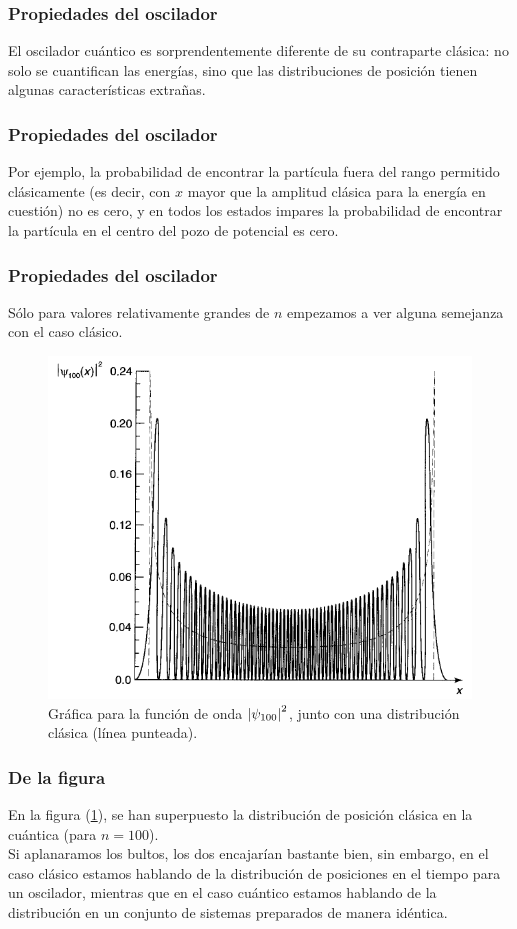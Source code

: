 \documentclass[12pt]{beamer}
\begin{document}
\begin{frame}
\frametitle{Propiedades del oscilador}
El oscilador cuántico es sorprendentemente diferente de su contraparte clásica: \pause 
no solo se cuantifican las energías, sino que las distribuciones de posición tienen algunas características extrañas. 
\end{frame}
\begin{frame}
\frametitle{Propiedades del oscilador}
Por ejemplo, la probabilidad de encontrar la partícula fuera del rango permitido clásicamente (es decir, con $x$ mayor que la amplitud clásica para la energía en cuestión) no es cero, \pause y en todos los estados impares la probabilidad de encontrar la partícula en el centro del pozo de potencial es cero.
\end{frame}
\begin{frame}
\frametitle{Propiedades del oscilador}    
Sólo para valores relativamente grandes de $n$ empezamos a ver alguna semejanza con el caso clásico. 
\end{frame}
\begin{frame}[plain]
\begin{figure}[H]
    \centering
    \includegraphics[scale=0.35]{Imagenes/Funcion_Onda_100.png}
    \caption{Gráfica para la función de onda $\abs{\psi_{100}}^{2}$, junto con una distribución clásica (línea punteada).}
    \label{figura_004}
\end{figure}
\end{frame}
\begin{frame}
\frametitle{De la figura}
En la figura (\ref{figura_004}), se han superpuesto la distribución de posición clásica en la cuántica (para $n = 100$).
\\
\bigskip
\pause
Si aplanaramos los bultos, los dos encajarían bastante bien, \pause sin embargo, en el caso clásico estamos hablando de la distribución de posiciones en el tiempo para un oscilador, \pause mientras que en el caso cuántico estamos hablando de la distribución en un conjunto de sistemas preparados de manera idéntica.
\end{frame}
\end{document}
